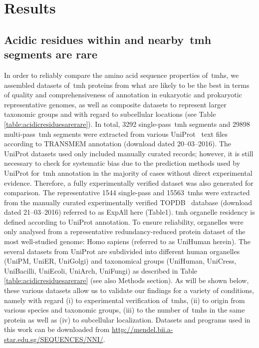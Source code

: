 \section{Results}

\subsection{Acidic residues within and nearby~\gls{tmh} segments are rare}

In order to reliably compare the amino acid sequence properties of~\gls{tmh}s, we assembled datasets of~\gls{tmh} proteins from what are likely to be the best in terms of quality and comprehensiveness of annotation in eukaryotic and prokaryotic representative genomes, as well as composite datasets to represent larger taxonomic groups and with regard to subcellular locations (see Table \ref{table:acidicresiduesarerare}).
In total, 3292 single-pass~\gls{tmh} segments and 29898 multi-pass~\gls{tmh} segments were extracted from various UniProt~\cite{TheUniProtConsortium2014} text files according to TRANSMEM annotation (download dated 20--03--2016).
The UniProt datasets used only included manually curated records; however, it is still necessary to check for systematic bias due to the prediction methods used by UniProt for~\gls{tmh} annotation in the majority of cases without direct experimental evidence.
Therefore, a fully experimentally verified dataset was also generated for comparison.
The representative 1544 single-pass and 15563~\gls{tmh}s were extracted from the manually curated experimentally verified TOPDB~\cite{Dobson2015} database (download dated 21--03--2016) referred to as ExpAll here (Table1).
\gls{tmh} organelle residency is defined according to UniProt annotation.
To ensure reliability, organelles were only analysed from a representative redundancy-reduced protein dataset of the most well-studied genome: Homo sapiens (referred to as UniHuman herein).
The several datasets from UniProt  are subdivided into different human organelles (UniPM, UniER, UniGolgi) and taxonomical groups (UniHuman, UniCress, UniBacilli, UniEcoli, UniArch, UniFungi) as described in Table \ref{table:acidicresiduesarerare} (see also Methods section).
As will be shown below, these various datasets allow us to validate our findings for a variety of conditions, namely with regard (i) to experimental verification of~\gls{tmh}s, (ii) to origin from various species and taxonomic groups, (iii) to the number of~\gls{tmh}s in the same protein as well as (iv) to subcellular localization.
Datasets and programs used in this work can be downloaded from \url{http://mendel.bii.a-star.edu.sg/SEQUENCES/NNI/}.

